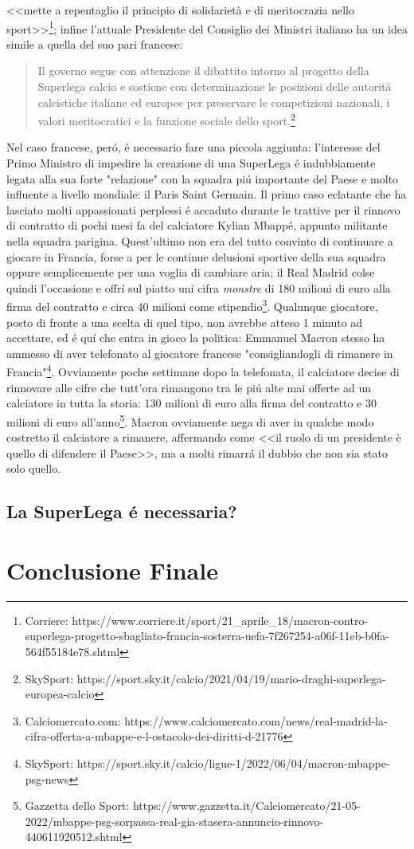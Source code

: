 \documentclass[
    corpo=12pt,
    oneside,
    evenboxes,
    tipotesi=triennale,
    stile=classica,
    oldstyle,
    autoretitolo,
    greek,
]{toptesi}
\begin{document}
\begin{interlinea}{1.5}
<<mette a repentaglio il principio di solidarietà e di meritocrazia nello sport>>\footnote{Corriere: https://www.corriere.it/sport/21\_aprile\_18/macron-contro-superlega-progetto-sbagliato-francia-sosterra-uefa-7f267254-a06f-11eb-b0fa-564f55184e78.shtml};
infine l'attuale Presidente del Consiglio dei Ministri italiano ha un idea simile a quella del suo pari francese: \begin{quote}
    \small Il governo segue con attenzione il dibattito intorno al progetto della Superlega calcio e sostiene con determinazione le posizioni delle autorità calcistiche italiane ed europee per preservare le competizioni nazionali, i valori meritocratici e la funzione sociale dello sport.\footnote{SkySport: https://sport.sky.it/calcio/2021/04/19/mario-draghi-superlega-europea-calcio}
\end{quote} 
Nel caso francese, per\'o, \'e necessario fare una piccola aggiunta: l'interesse del Primo Ministro di impedire la creazione di una SuperLega
\'e indubbiamente legata alla sua forte "relazione" con la squadra pi\'u importante del Paese e molto influente a livello mondiale: il Paris Saint Germain.
Il primo caso eclatante che ha lasciato molti appassionati perplessi \'e accaduto durante le trattive per il rinnovo di contratto di pochi mesi fa del calciatore
Kylian Mbapp\'e, appunto militante nella squadra parigina. Quest'ultimo non era del tutto convinto di continuare a giocare in Francia, forse 
a per le continue delusioni sportive della sua squadra oppure semplicemente per una voglia di cambiare aria; il Real Madrid colse quindi l'occasione e offr\'i
sul piatto uni cifra \emph{monstre} di 180 milioni di euro alla firma del contratto e circa 40 milioni come stipendio\footnote{Calciomercato.com: https://www.calciomercato.com/news/real-madrid-la-cifra-offerta-a-mbappe-e-l-ostacolo-dei-diritti-d-21776}.
Qualunque giocatore, posto di fronte a una scelta di quel tipo, non avrebbe atteso 1 minuto ad accettare, ed \'e qu\'i che entra in gioco la politica: Emmanuel Macron 
stesso ha ammesso di aver telefonato al giocatore francese "consigliandogli di rimanere in Francia"\footnote{SkySport: https://sport.sky.it/calcio/ligue-1/2022/06/04/macron-mbappe-psg-news}.
Ovviamente poche settimane dopo la telefonata, il calciatore decise di rinnovare alle cifre che tutt'ora rimangono tra le pi\'u alte mai
offerte ad un calciatore in tutta la storia: 130 milioni di euro alla firma del contratto e 30 milioni di euro all'anno\footnote{Gazzetta dello Sport: https://www.gazzetta.it/Calciomercato/21-05-2022/mbappe-psg-sorpassa-real-gia-stasera-annuncio-rinnovo-440611920512.shtml}. Macron ovviamente 
nega di aver in qualche modo costretto il calciatore a rimanere, affermando come <<il ruolo di un presidente è quello di difendere il Paese>>, ma 
a molti rimarr\'a il dubbio che non sia stato solo quello.
\section{La SuperLega \'e necessaria?}
\chapter{Conclusione Finale}
\end{interlinea}
\end{document}

